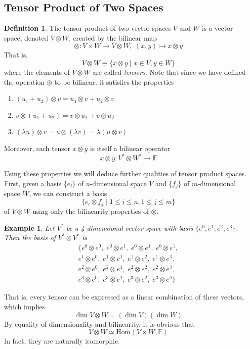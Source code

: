 \documentclass{article}
\newtheorem{example}{Example}[section]
\theoremstyle{remark}
\theoremstyle{definition}
\newtheorem{definition}{Definition}[section]
\begin{document}
\subsection{Tensor Product of Two Spaces}
\begin{definition}
The tensor product of two vector spaces $V$ and $W$ is a vector space, denoted $V \otimes W$, created by the bilinear map 
\[\otimes: V \times W \longrightarrow V \otimes W, \; (x, y) \mapsto x \otimes y\]
That is, 
\[V \otimes W \equiv \{ x \otimes y \; | \; x \in V, y \in W\} \]
where the elements of $V \otimes W$ are called \textit{tensors}. Note that since we have defined the operation $\otimes$ to be bilinear, it satisfies the properties
\begin{enumerate}
    \item $(u_1 + u_2) \otimes v = u_1 \otimes v + u_2 \otimes v$
    \item $v \otimes (u_1 + u_2) = v \otimes u_1 + v \otimes u_2$
    \item $(\lambda u) \otimes v = u \otimes (\lambda v) = \lambda (u \otimes v)$ 
\end{enumerate}
Moreover, each tensor $x \otimes y$ is itself a bilinear operator
\[x \otimes y: V^* \otimes W^* \longrightarrow \mathbb{F}\]
\end{definition}

Using these properties we will deduce further qualities of tensor product spaces. First, given a basis $\{e_i\}$ of $n$-dimensional space $V$ and $\{f_j\}$ of $m$-dimensional space $W$, we can construct a basis 
\[\{e_i \otimes f_j \; | \; 1 \leq i \leq n, 1 \leq j \leq m\}\]
of $V \otimes W$ using only the bilinearity properties of $\otimes$. 

\begin{example}
Let $V^*$ be a 4-dimensional vector space with basis $\{ e^0, e^1, e^2, e^3\}$. Then the basis of $V^* \otimes V^*$ is
\begin{align*} 
\{e^0 \otimes e^0, \; e^0 \otimes e^1, \;e^0 \otimes e^1, \;e^0 \otimes e^1, \\
e^1 \otimes e^0,\; e^1 \otimes e^1,\; e^1 \otimes e^2,\; e^1 \otimes e^3, \\
e^2 \otimes e^0,\; e^2 \otimes e^1,\; e^2 \otimes e^2,\; e^2 \otimes e^3, \\
e^3 \otimes e^0,\; e^3 \otimes e^1,\; e^3 \otimes e^2,\; e^3 \otimes e^3\}
\end{align*}
\end{example}

That is, every tensor can be expressed as a linear combination of these vectors, which implies
\[\dim{V \otimes W} = (\dim{V}) (\dim{W})\]
By equality of dimensionality and bilinearity, it is obvious that
\[V \otimes W \simeq \text{Hom}(V \times W, \mathbb{F})\]
In fact, they are naturally isomorphic. 
\end{document}
